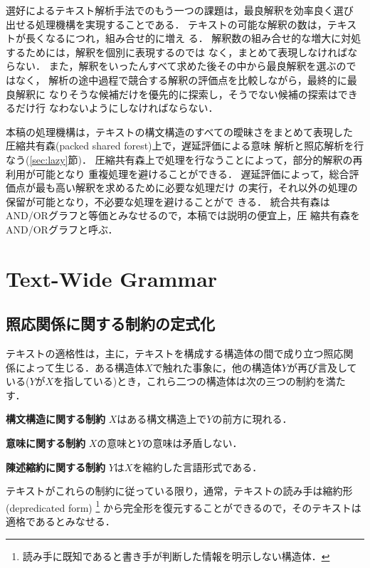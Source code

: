 選好によるテキスト解析手法でのもう一つの課題は，最良解釈を効率良く選び
出せる処理機構を実現することである．
テキストの可能な解釈の数は，テキストが長くなるにつれ，組み合せ的に増え
る．
解釈数の組み合せ的な増大に対処するためには，解釈を個別に表現するのでは
なく，まとめて表現しなければならない．
また，解釈をいったんすべて求めた後その中から最良解釈を選ぶのではなく，
解析の途中過程で競合する解釈の評価点を比較しながら，最終的に最良解釈に
なりそうな候補だけを優先的に探索し，そうでない候補の探索はできるだけ行
なわないようにしなければならない．

本稿の処理機構は，テキストの構文構造のすべての曖昧さをまとめて表現した
圧縮共有森(packed shared forest)\cite{Tomita85}上で，遅延評価による意味
解析と照応解析を行なう(\ref{sec:lazy}節)．
圧縮共有森上で処理を行なうことによって，部分的解釈の再利用が可能となり
重複処理を避けることができる．
遅延評価によって，総合評価点が最も高い解釈を求めるために必要な処理だけ
の実行，それ以外の処理の保留が可能となり，不必要な処理を避けることがで
きる．
統合共有森はAND/ORグラフと等価とみなせるので，本稿では説明の便宜上，圧
縮共有森をAND/ORグラフと呼ぶ．

\section{Text-Wide Grammar}
\label{sec:twg}

\subsection{照応関係に関する制約の定式化}
\label{sec:twg:corref}

テキストの適格性は，主に，テキストを構成する構造体の間で成り立つ照応関
係によって生じる．\hspace{-0.3mm}ある構造体$X$\hspace{-0.1mm}で触れた事象に，\hspace{-0.3mm}他の構造体$Y$\hspace{-0.1mm}が再び言及している($Y$\hspace{-0.1mm}が\hspace{-0.1mm}$X$\hspace{-0.1mm}を指している)とき，これら二つの構造体は次の三つの制約を満たす．
\begin{LIST}
\item[\bf 構文構造に関する制約] $X$はある構文構造上で$Y$の前方に現れる．
\item[\bf 意味に関する制約] $X$の意味と$Y$の意味は矛盾しない．
\item[\bf 陳述縮約に関する制約] $Y$は$X$を縮約した言語形式である． 
\end{LIST}
テキストがこれらの制約に従っている限り，通常，テキストの読み手は縮約形
(depredicated form)
\footnote{読み手に既知であると書き手が判断した情報を明示しない構造体．}
から完全形を復元することができるので，そのテキストは適格であるとみなせる．

